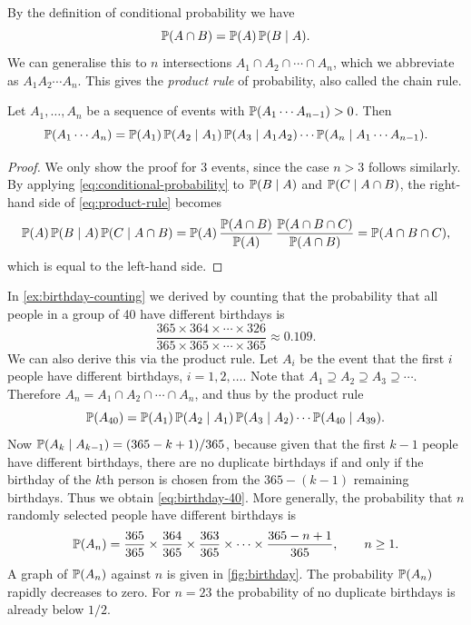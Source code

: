 By the definition of conditional probability we have
\[
  \mathbb{P}(A \cap B) = \mathbb{P}(A)\,\mathbb{P}(B \mid A).
\]
We can generalise this to $n$ intersections $A_1 \cap A_2 \cap \cdots \cap A_n$, which we abbreviate as $A_1 A_2 \cdots A_n$. This gives the \emph{product rule} of probability, also called the chain rule.

\begin{theorem}\label{thm:product-rule}
\raggedright Let $A_1, \ldots, A_n$ be a sequence of events with $\mathbb{P}(A_1 \cdots A_{n-1}) > 0$. Then
\begin{equation}\label{eq:product-rule}
  \mathbb{P}(A_1 \cdots A_n) = \mathbb{P}(A_1)\,\mathbb{P}(A_2 \mid A_1)\,\mathbb{P}(A_3 \mid A_1 A_2) \cdots \mathbb{P}(A_n \mid A_1 \cdots A_{n-1}).
\end{equation}
\end{theorem}

\begin{proof}
We only show the proof for 3 events, since the case $n > 3$ follows similarly. By applying \eqref{eq:conditional-probability} to $\mathbb{P}(B \mid A)$ and $\mathbb{P}(C \mid A \cap B)$, the right-hand side of \eqref{eq:product-rule} becomes
\[
  \mathbb{P}(A)\,\mathbb{P}(B \mid A)\,\mathbb{P}(C \mid A \cap B) = \mathbb{P}(A)\,\frac{\mathbb{P}(A \cap B)}{\mathbb{P}(A)}\,\frac{\mathbb{P}(A \cap B \cap C)}{\mathbb{P}(A \cap B)} = \mathbb{P}(A \cap B \cap C),
\]
which is equal to the left-hand side.
\end{proof}

\begin{example}\label{ex:birthday-product-rule}
In \cref{ex:birthday-counting} we derived by counting that the probability that all people in a group of 40 have different birthdays is
\begin{equation}\label{eq:birthday-40}
  \frac{365 \times 364 \times \cdots \times 326}{365 \times 365 \times \cdots \times 365} \approx 0.109.
\end{equation}
We can also derive this via the product rule. Let $A_i$ be the event that the first $i$ people have different birthdays, $i = 1, 2, \ldots$. Note that $A_1 \supseteq A_2 \supseteq A_3 \supseteq \cdots$. Therefore $A_n = A_1 \cap A_2 \cap \cdots \cap A_n$, and thus by the product rule
\[
  \mathbb{P}(A_{40}) = \mathbb{P}(A_1)\,\mathbb{P}(A_2 \mid A_1)\,\mathbb{P}(A_3 \mid A_2) \cdots \mathbb{P}(A_{40} \mid A_{39}).
\]
Now $\mathbb{P}(A_k \mid A_{k-1}) = (365 - k + 1)/365$, because given that the first $k - 1$ people have different birthdays, there are no duplicate birthdays if and only if the birthday of the $k$th person is chosen from the $365 - (k - 1)$ remaining birthdays. Thus we obtain \eqref{eq:birthday-40}. More generally, the probability that $n$ randomly selected people have different birthdays is
\[
  \mathbb{P}(A_n) = \frac{365}{365} \times \frac{364}{365} \times \frac{363}{365} \times \cdots \times \frac{365 - n + 1}{365}, \qquad n \ge 1.
\]
A graph of $\mathbb{P}(A_n)$ against $n$ is given in \cref{fig:birthday}. The probability $\mathbb{P}(A_n)$ rapidly decreases to zero. For $n = 23$ the probability of no duplicate birthdays is already below $1/2$.
\end{example}

